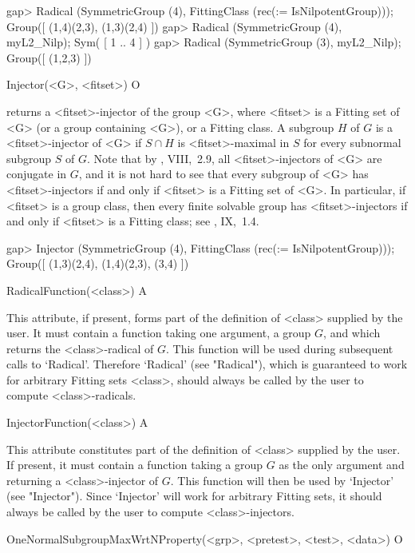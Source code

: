 \beginexample
gap> Radical (SymmetricGroup (4), FittingClass (rec(\in := IsNilpotentGroup)));
Group([ (1,4)(2,3), (1,3)(2,4) ])
gap> Radical (SymmetricGroup (4), myL2_Nilp);
Sym( [ 1 .. 4 ] ) 
gap> Radical (SymmetricGroup (3), myL2_Nilp);
Group([ (1,2,3) ])
\endexample

\>Injector(<G>, <fitset>) O

returns a <fitset>-injector of the group <G>, where <fitset> is a
Fitting set of <G> (or a group containing <G>), or a Fitting class. A
subgroup $H$ of $G$ is a <fitset>-injector of <G> if $S \cap H$ is
<fitset>-maximal in $S$ for every subnormal subgroup $S$ of $G$. Note that by 
\cite{DH92}, VIII,~2.9, all <fitset>-injectors of <G> are conjugate in $G$,
and it is not hard to see that every subgroup of <G> has <fitset>-injectors
if and only if <fitset> is a Fitting set of <G>. In particular, if <fitset>
is a group class, then every finite
solvable group has <fitset>-injectors if and only if <fitset> is a Fitting
class; see \cite{DH92}, IX,~1.4.

\beginexample
gap> Injector (SymmetricGroup (4), FittingClass (rec(\in := IsNilpotentGroup)));
Group([ (1,3)(2,4), (1,4)(2,3), (3,4) ])
\endexample

\>RadicalFunction(<class>) A

This attribute, if present, forms part of the definition of <class> supplied
by the user. It must contain a function taking one argument, a group
$G$, and which  returns the <class>-radical of $G$. This function
will be used during subsequent calls to `Radical'. Therefore
`Radical' (see "Radical"), which is guaranteed to work for
arbitrary  Fitting sets <class>, should always be called by the user to
compute <class>-radicals.

\>InjectorFunction(<class>) A

This attribute constitutes part of the definition of <class> supplied by the
user. If present, it must contain a function taking a group
$G$ as the only argument and returning a <class>-injector of $G$. This
function will then be used by `Injector' (see "Injector"). Since `Injector'
will work for arbitrary  Fitting sets, it should always be called by the user
to compute <class>-injectors.


\null


\>OneNormalSubgroupMaxWrtNProperty(<grp>, <pretest>, <test>, <data>) O


